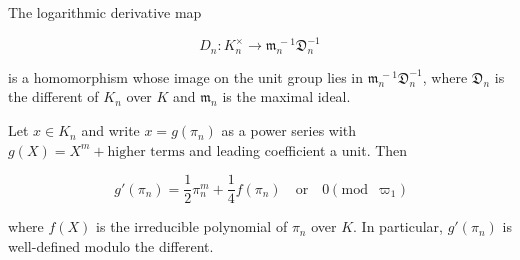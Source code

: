 The logarithmic derivative map

$$
D_n : K_n^\times \longrightarrow \mathfrak{m}_n^{\,-1} \mathfrak{D}_n^{-1}
$$

is a homomorphism whose image on the unit group lies in $\mathfrak{m}_n^{\,-1} \mathfrak{D}_n^{-1}$, where $\mathfrak{D}_n$ is the different of $K_n$ over $K$ and $\mathfrak{m}_n$ is the maximal ideal.

Let $x \in K_n$ and write $x = g(\pi_n)$ as a power series with $g(X) = X^m + \text{higher terms}$ and leading coefficient a unit. Then

$$
g'(\pi_n) = \frac{1}{2} \pi_n^m + \frac{1}{4} f(\pi_n) \quad \text{or} \quad 0 \pmod{\varpi_1}
$$

where $f(X)$ is the irreducible polynomial of $\pi_n$ over $K$. In particular, $g'(\pi_n)$ is well-defined modulo the different.

